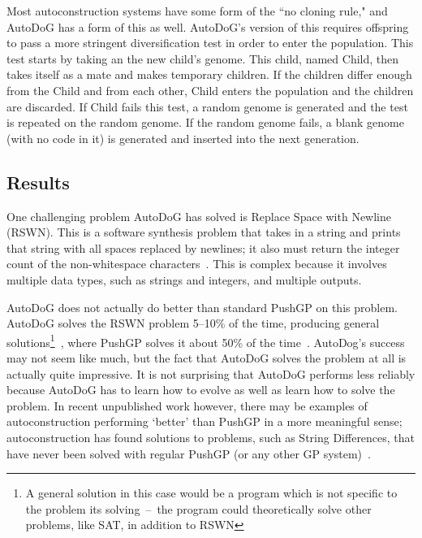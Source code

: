 \documentclass{sig-alternate}
\begin{document}
Most autoconstruction systems have some form of the ``no cloning rule," and AutoDoG has a form of this as well. AutoDoG's version of this requires offspring to pass a more stringent diversification test in order to enter the population. This test starts by taking an the new child's genome. This child, named Child, then takes itself as a mate and makes temporary children. If the children differ enough from the Child and from each other, Child enters the population and the children are discarded. If Child fails this test, a random genome is generated and the test is repeated on the random genome. If the random genome fails, a blank genome (with no code in it) is generated and inserted into the next generation.

\subsection{Results}
One challenging problem AutoDoG has solved is Replace Space with Newline (RSWN). This is a software synthesis problem that takes in a string and prints that string with all spaces replaced by newlines; it also must return the integer count of the non-whitespace characters~\cite{helmuth:2015}. This is complex because it involves multiple data types, such as strings and integers, and multiple outputs.

AutoDoG does not actually do better than standard PushGP on this problem. AutoDoG solves the RSWN problem 5--10\% of the time, producing general solutions\footnote{A general solution in this case would be a program which is not specific to the problem its solving~--~the program could theoretically solve other problems, like SAT, in addition to RSWN }~\cite{spector:2016}, where PushGP solves it about 50\% of the time~\cite{helmuth:2015}. AutoDog's success may not seem like much, but the fact that AutoDoG solves the problem at all is actually quite impressive. It is not surprising that AutoDoG performs less reliably because AutoDoG has to learn how to evolve as well as learn how to solve the problem. In recent unpublished work however, there may be examples of autoconstruction performing `better' than PushGP in a more meaningful sense; autoconstruction has found solutions to problems, such as String Differences, that have never been solved with regular PushGP (or any other GP system)~\cite{eva:2017}.\cite{spector:2016}
\end{document}
